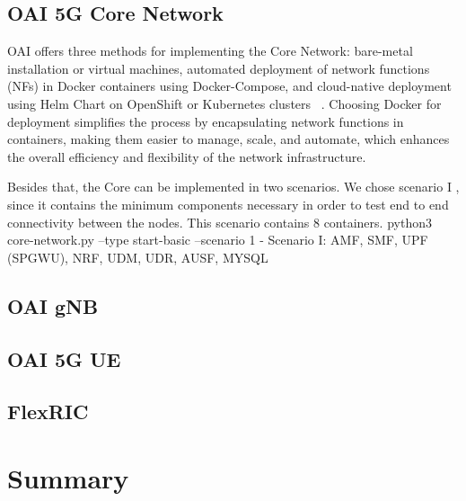 \subsection{OAI 5G Core Network}
OAI offers three methods for implementing the Core Network: bare-metal installation or virtual machines, automated deployment of network functions (NFs) in Docker containers using Docker-Compose, and cloud-native deployment using Helm Chart on OpenShift or Kubernetes clusters ~\cite{}.
Choosing Docker for deployment simplifies the process by encapsulating network functions in containers, making them easier to manage, scale, and automate, which enhances the overall efficiency and flexibility of the network infrastructure.

Besides that, the Core can be implemented in two scenarios.
We chose scenario I , since it contains the minimum components necessary in order to test end to end connectivity between the nodes.
This scenario contains 8 containers.
python3 core-network.py --type start-basic --scenario 1
- Scenario I:  AMF, SMF, UPF (SPGWU), NRF, UDM, UDR, AUSF, MYSQL


\subsection{OAI gNB}
\subsection{OAI 5G UE}
\subsection{FlexRIC}


\section{Summary}






